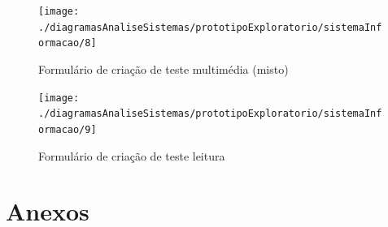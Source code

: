 \documentclass[a4paper]{article}
\begin{document}
		\newpage

			\begin{figure}[h]
						\centering
						\texttt{[image: ./diagramasAnaliseSistemas/prototipoExploratorio/sistemaInformacao/8]}
						\caption{Formulário de criação de teste multimédia (misto)}
						\label{fig:5}
					\end{figure}
	
		
				\begin{figure}[h]
					\centering
					\texttt{[image: ./diagramasAnaliseSistemas/prototipoExploratorio/sistemaInformacao/9]}
					\caption{Formulário de criação de teste leitura}
					\label{fig:5}
				\end{figure}

		
		
		\section{Anexos}
		
		
					
\end{document}
